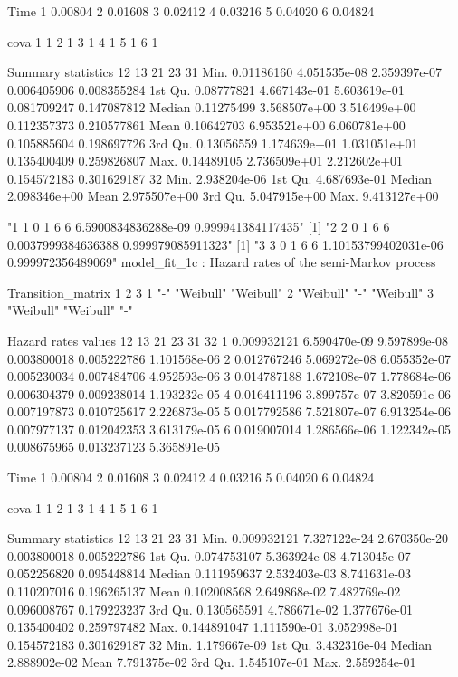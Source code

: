 \documentclass[11pt,a4paper]{article}
\begin{document}
\begin{enumerate}
\begin{Schunk}
\begin{Soutput}
     Time
1 0.00804
2 0.01608
3 0.02412
4 0.03216
5 0.04020
6 0.04824

  cova
1    1
2    1
3    1
4    1
5    1
6    1

Summary statistics
                12           13           21          23          31
Min.    0.01186160 4.051535e-08 2.359397e-07 0.006405906 0.008355284
1st Qu. 0.08777821 4.667143e-01 5.603619e-01 0.081709247 0.147087812
Median  0.11275499 3.568507e+00 3.516499e+00 0.112357373 0.210577861
Mean    0.10642703 6.953521e+00 6.060781e+00 0.105885604 0.198697726
3rd Qu. 0.13056559 1.174639e+01 1.031051e+01 0.135400409 0.259826807
Max.    0.14489105 2.736509e+01 2.212602e+01 0.154572183 0.301629187
                  32
Min.    2.938204e-06
1st Qu. 4.687693e-01
Median  2.098346e+00
Mean    2.975507e+00
3rd Qu. 5.047915e+00
Max.    9.413127e+00
\end{Soutput}
\begin{Soutput}
[1] "1 1 0 1 6 6 6.5900834836288e-09 0.999941384117435"
[1] "2 2 0 1 6 6 0.0037999384636388 0.999979085911323"
[1] "3 3 0 1 6 6 1.10153799402031e-06 0.999972356489069"
model_fit_1c  : Hazard rates of the semi-Markov process

Transition_matrix
  1         2         3        
1 "-"       "Weibull" "Weibull"
2 "Weibull" "-"       "Weibull"
3 "Weibull" "Weibull" "-"      

Hazard rates values 
           12           13           21          23          31           32
1 0.009932121 6.590470e-09 9.597899e-08 0.003800018 0.005222786 1.101568e-06
2 0.012767246 5.069272e-08 6.055352e-07 0.005230034 0.007484706 4.952593e-06
3 0.014787188 1.672108e-07 1.778684e-06 0.006304379 0.009238014 1.193232e-05
4 0.016411196 3.899757e-07 3.820591e-06 0.007197873 0.010725617 2.226873e-05
5 0.017792586 7.521807e-07 6.913254e-06 0.007977137 0.012042353 3.613179e-05
6 0.019007014 1.286566e-06 1.122342e-05 0.008675965 0.013237123 5.365891e-05

     Time
1 0.00804
2 0.01608
3 0.02412
4 0.03216
5 0.04020
6 0.04824

  cova
1    1
2    1
3    1
4    1
5    1
6    1

Summary statistics
                 12           13           21          23          31
Min.    0.009932121 7.327122e-24 2.670350e-20 0.003800018 0.005222786
1st Qu. 0.074753107 5.363924e-08 4.713045e-07 0.052256820 0.095448814
Median  0.111959637 2.532403e-03 8.741631e-03 0.110207016 0.196265137
Mean    0.102008568 2.649868e-02 7.482769e-02 0.096008767 0.179223237
3rd Qu. 0.130565591 4.786671e-02 1.377676e-01 0.135400402 0.259797482
Max.    0.144891047 1.111590e-01 3.052998e-01 0.154572183 0.301629187
                  32
Min.    1.179667e-09
1st Qu. 3.432316e-04
Median  2.888902e-02
Mean    7.791375e-02
3rd Qu. 1.545107e-01
Max.    2.559254e-01
\end{Soutput}
\end{Schunk}


\end{enumerate}
\end{document}
